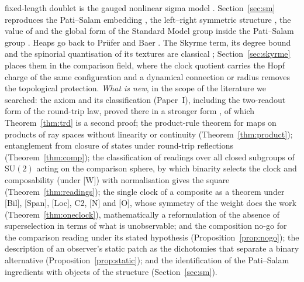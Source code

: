 \documentclass[aps,pra,onecolumn,superscriptaddress,nofootinbib,10pt]{revtex4-2}
\theoremstyle{definition}
\theoremstyle{remark}
\newcommand{\SU}{\mathrm{SU}}
\begin{document}
fixed-length doublet is the gauged nonlinear sigma model \cite{AB80}.  Section~\ref{sec:sm} reproduces the
Pati--Salam embedding \cite{PatiSalam}, the left--right symmetric structure
\cite{MohapatraPati,SenjanovicMohapatra}, the value of \cite{GQW} and the global form of the Standard Model
group inside the Pati--Salam group \cite{BaezHuerta}.  Heaps go back to Pr\"ufer and Baer
\cite{Prufer24,Baer29}.  The Skyrme term, its degree bound and the spinorial quantisation of its
textures are classical \cite{n6:skyrme,n6:faddeev,n6:fr-original,n6:giulini}; Section~\ref{sec:skyrme}
places them in the comparison field, where the clock quotient carries the Hopf charge of the same
configuration and a dynamical connection or radius removes the topological protection.
\emph{What is new}, in the scope of the literature we searched: the axiom and its classification
(Paper~I), including the two-readout form of the round-trip law, proved there in a stronger form
\cite[Thm.~4.5]{PaperI}, of which Theorem~\ref{thm:trd} is a second proof; the product-rule theorem
for maps on products of ray spaces without linearity or continuity (Theorem~\ref{thm:product});
entanglement from closure of states under round-trip reflections (Theorem~\ref{thm:comp}); the
classification of readings over all closed subgroups of $\SU(2)$ acting on the comparison sphere,
by which binarity selects the clock and composability (under [W]) with normalisation gives the square
(Theorem~\ref{thm:readings}); the single clock of a composite as a theorem under [Bil], [Span], [Loc], C2, [N] and [O], whose
symmetry of the weight does the work (Theorem~\ref{thm:oneclock}), mathematically a reformulation of the
absence of superselection in terms of what is unobservable; and the composition no-go for the comparison reading under its stated
hypothesis (Proposition~\ref{prop:nogo}); the description of an
observer's static patch as the dichotomies that separate a binary alternative
(Proposition~\ref{prop:static}); and the identification of the Pati--Salam ingredients with objects of
the structure (Section~\ref{sec:sm}).
\end{document}
